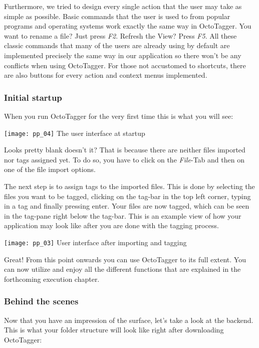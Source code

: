 Furthermore, we tried to design every single action that the user may take as simple as possible. Basic commands that the user is used to from popular programs and operating systems work exactly the same way in OctoTagger. You want to rename a file? Just press \textit{F2}. Refresh the View? Press \textit{F5}. All these classic commands that many of the users are already using by default are implemented precisely the same way in our application so there won't be any conflicts when using OctoTagger. For those not accustomed to shortcuts, there are also buttons for every action and context menus implemented.

\subsubsection{Initial startup}
When you run OctoTagger for the very first time this is what you will see:

\begin{center}
\texttt{[image: pp\_04]}
\small{The user interface at startup}
\end{center}


Looks pretty blank doesn't it? That is because there are neither files imported nor tags assigned yet. To do so, you have to click on the \textit{File}-Tab and then on one of the file import options.

The next step is to assign tags to the imported files. This is done by selecting the files you want to be tagged, clicking on the tag-bar in the top left corner, typing in a tag and finally pressing enter. Your files are now tagged, which can be seen in the tag-pane right below the tag-bar.
This is an example view of how your application may look like after you are done with the tagging process.

\begin{center}
\texttt{[image: pp\_03]}
\small{User interface after importing and tagging}
\end{center}


Great! From this point onwards you can use OctoTagger to its full extent. You can now utilize and enjoy all the different functions that are explained in the forthcoming execution chapter. %

\subsubsection{Behind the scenes}
Now that you have an impression of the surface, let's take a look at the backend. This is what your folder structure will look like right after downloading OctoTagger:


